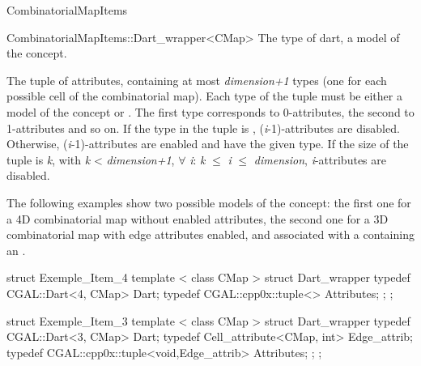 \begin{ccRefConcept}{CombinatorialMapItems}
\begin{ccClass}{CombinatorialMapItems::Dart_wrapper<CMap>}
    {The type of dart, a model of the  concept.}

{The tuple of attributes, containing at most
  \emph{dimension+1} types (one for each possible cell of the combinatorial
  map).  Each type of the tuple must be either a model of the
   concept or .
  The first type corresponds to 0-attributes, 
  the second to 1-attributes and so on. 
  If the  type in the tuple is , 
  (\emph{i}-1)-attributes are disabled. Otherwise, (\emph{i}-1)-attributes are enabled and
  have the given type.  If the size of the tuple is \emph{k},
  with \emph{k} < \emph{dimension+1}, $\forall$ \emph{i}: \emph{k} $\leq$ \emph{i} $\leq$ \emph{dimension},
  \emph{i}-attributes are disabled.}
\end{ccClass}

\ccExample
The following examples show two possible models of the
 concept: the first one for a 4D
combinatorial map without enabled attributes, the second one for a 3D
combinatorial map with edge attributes enabled, and associated with a
 containing an .

\begin{ccExampleCode}
struct Exemple_Item_4
{
   template < class CMap >
   struct Dart_wrapper
   {
     typedef CGAL::Dart<4, CMap> Dart;
     typedef CGAL::cpp0x::tuple<> Attributes;
   };
};
\end{ccExampleCode}

\begin{ccExampleCode}
struct Exemple_Item_3
{
   template < class CMap >
   struct Dart_wrapper
   {
     typedef CGAL::Dart<3, CMap> Dart;
     typedef Cell_attribute<CMap, int> Edge_attrib;
     typedef CGAL::cpp0x::tuple<void,Edge_attrib> Attributes;
   };
};
\end{ccExampleCode}    

\ccHasModels
{}

\ccSeeAlso
\\

\end{ccRefConcept}
\ccRefPageEnd

